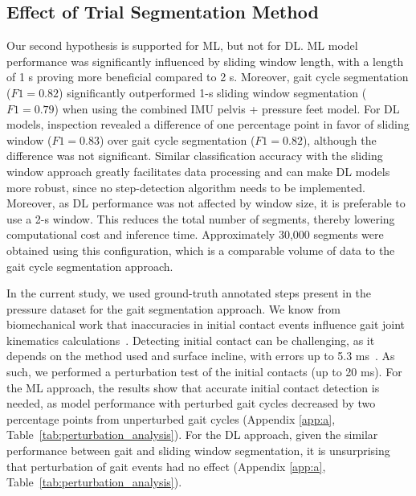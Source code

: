 \documentclass[sensors,article,accept,pdftex,moreauthors]{Definitions/mdpi}
\begin{document}

\subsection{Effect of Trial Segmentation Method}
Our second hypothesis is supported \textcolor{revision}{for ML, but not for DL}. {ML model performance was significantly influenced by sliding window length, with a length of 1 s proving more beneficial compared to 2 s. Moreover,} gait cycle segmentation ($F1=0.82$) significantly outperformed {1-s} sliding window segmentation ($F1=0.79$) when using the combined IMU {pelvis} + pressure feet model. For DL models, inspection revealed a difference of {one percentage point in favor of} sliding window ($F1=0.83$) over gait cycle segmentation ($F1= 0.82$), although the difference was not significant. Similar classification accuracy with the sliding window approach greatly facilitates data processing and can make DL models more robust, since no step-detection algorithm needs to be implemented. {Moreover, as DL performance was not affected by window size, it is preferable to use a 2-s window. This reduces the total number of segments, thereby lowering computational cost and inference time. Approximately 30,000 segments were obtained using this configuration, which is a comparable volume of data to the gait cycle segmentation approach.} 

{In the current study, we used ground-truth annotated steps present in the pressure dataset for the gait segmentation approach. We know from biomechanical work that inaccuracies in initial contact events influence gait joint kinematics calculations~\cite{DUMPHART2026110012}. %
Detecting initial contact can be challenging, as it depends on the method used and surface incline, with errors up to 5.3 ms~\cite{Blades2023Evaluation}.}
As such, we performed a perturbation test of the initial contacts (up to 20 ms). For the ML approach, the results show that accurate initial contact detection is needed, as model performance with perturbed gait cycles decreased by two percentage points from unperturbed gait cycles (Appendix \ref{app:a}, Table~\ref{tab:perturbation_analysis}). {For the DL approach, given the similar performance between gait and sliding window segmentation, it is unsurprising that perturbation of gait events had no effect (Appendix \ref{app:a}, Table~\ref{tab:perturbation_analysis}).}
\end{document}
